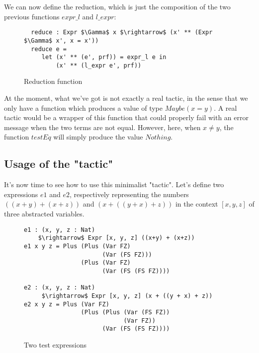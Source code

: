 We can now define the reduction, which is just the composition of the two previous functions $expr\_l$ and $l\_expr$:

\begin{figure}[H]
\figrule
\begin{center}
\begin{lstlisting}
  reduce : Expr $\Gamma$ x $\rightarrow$ (x' ** (Expr $\Gamma$ x', x = x'))
  reduce e = 
     let (x' ** (e', prf)) = expr_l e in
         (x' ** (l_expr e', prf))
\end{lstlisting}
\end{center}
\caption{Reduction function}
\figrule
\end{figure}


At the moment, what we've got is not exactly a real tactic, in the sense that we only have a function which produces a value of type $Maybe (x = y)$. A real tactic would be a wrapper of this function that could properly fail with an error message when the two terms are not equal. However, here, when $x\ne y$, the function $testEq$ will simply produce the value $Nothing$. \\

\subsection{Usage of the "tactic"}

It's now time to see how to use this minimalist "tactic".
Let's define two expressions $e1$ and $e2$, respectively representing the numbers $((x + y) + (x + z))$ and $(x + ((y + x) + z))$ in the context $[x, y, z]$ of three abstracted variables.


\begin{figure}[H]
\figrule
\begin{center}
\begin{lstlisting}
e1 : (x, y, z : Nat) 
    $\rightarrow$ Expr [x, y, z] ((x+y) + (x+z))
e1 x y z = Plus (Plus (Var FZ) 
                      (Var (FS FZ))) 
                (Plus (Var FZ) 
                      (Var (FS (FS FZ))))

e2 : (x, y, z : Nat) 
     $\rightarrow$ Expr [x, y, z] (x + ((y + x) + z))
e2 x y z = Plus (Var FZ) 
                (Plus (Plus (Var (FS FZ)) 
                            (Var FZ)) 
                      (Var (FS (FS FZ))))
\end{lstlisting}
\end{center}
\caption{Two test expressions}
\figrule
\end{figure}

